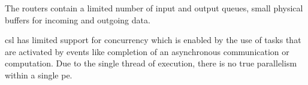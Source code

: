 The routers contain a limited number of input and output queues, small physical buffers for incoming and outgoing data.

\ac{csl} has limited support for concurrency which is enabled by the use of tasks that are activated by events like completion of an asynchronous communication or computation. Due to the single thread of execution, there is no true parallelism within a single \ac{pe}.
